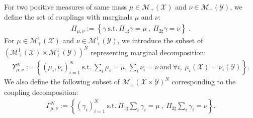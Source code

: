 For two positive measures of same mass $\mu\in\mathcal{M}_+(\mathcal{X})$ and $\nu\in\mathcal{M}_+(\mathcal{Y})$, we define the set of couplings with marginals $\mu$ and $\nu$:
\begin{align*}
    \Pi_{\mu,\nu}:=\left\{\gamma~\mathrm{s.t.}~ \Pi_{1\sharp}\gamma=\mu ~,~ \Pi_{2\sharp}\gamma=\nu\right\}\; .
\end{align*}
For $\mu\in\mathcal{M}_+^1(\mathcal{X})$ and $\nu\in\mathcal{M}_+^1(\mathcal{Y})$, we introduce the subset of $(\mathcal{M}_+^1(\mathcal{X})\times \mathcal{M}_+^1(\mathcal{Y}))^N$ representing marginal decomposition: 
\begin{align*}
 \textstyle\Upsilon_{\mu,\nu}^N:=\left\{(\mu_i,\nu_i)_{i=1}^N ~\mathrm{ s.t. }~ \sum_i \mu_i = \mu \mathrm{, } \sum_i \nu_i = \nu ~\mathrm{ and }~\forall i,~ \mu_i(\mathcal{X}) = \nu_i(\mathcal{Y})  \right\}.
\end{align*}
We also define the following subset of $\mathcal{M}_+(\mathcal{X}\times \mathcal{Y})^N$ corresponding to the coupling decomposition:
\begin{align*}
    \Gamma^N_{\mu,\nu}:=\left\{(\gamma_i)_{i=1}^N~\mathrm{s.t.}~ \Pi_{1\sharp}\sum_i\gamma_i=\mu ~,~ \Pi_{2\sharp}\sum_i\gamma_i=\nu\right\} .
\end{align*}



